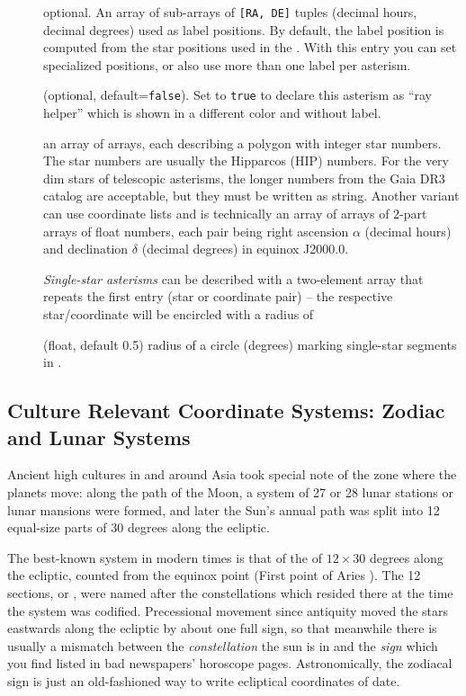 \begin{description}
\item[] optional. An array of sub-arrays of \texttt{[RA, DE]} tuples (decimal hours, decimal degrees) used as label positions. 
                               By default, the label position is computed from the star positions used in the . 
                               With this entry you can set specialized positions, or also use more than one label per asterism. 
\item[] (optional, default=\texttt{false}). 
                Set to \texttt{true} to declare this asterism as ``ray helper'' which is shown in a different color and without label. 
\item[] an array of arrays, each describing a polygon with integer star numbers. The star numbers are usually the Hipparcos (HIP) numbers. 
                    For the very dim stars of telescopic asterisms, the longer numbers from the Gaia DR3 catalog are acceptable, but they must be written as string.
					Another variant can use coordinate lists and is technically an array of arrays of 2-part arrays of float numbers, 
					each pair being right ascension $\alpha$ (decimal hours) and declination $\delta$ (decimal degrees) in equinox J2000.0. 

					\emph{Single-star asterisms}  can be described with a two-element array that repeats the first entry (star or coordinate pair)
					-- the respective star/coordinate will be encircled with a radius of
\item[] (float, default 0.5)  radius of a circle (degrees) marking single-star segments in .
\end{description}


\subsection{Culture Relevant Coordinate Systems: Zodiac and Lunar Systems}
\label{sec:skycultures:skyPartitions}
\label{SC:zodiac_lunarSystem}

Ancient high cultures in and around Asia took special note of the zone where the planets move: 
along the path of the Moon, a system of 27 or 28 lunar stations or lunar mansions were formed, 
and later the Sun's annual path was split into 12 equal-size parts of 30 degrees along the ecliptic.

The best-known system in modern times is that of the  of $12\times30$ degrees along the ecliptic, 
counted from the equinox point (First point of Aries \Aries). The 12 sections, or , 
were named after the constellations which resided there at the time the system was codified. 
Precessional movement since antiquity moved the stars eastwards along the ecliptic by about one full sign, so that meanwhile there is usually 
a mismatch between the \emph{constellation} the sun is in and the \emph{sign} which you find listed in bad newspapers' horoscope pages. 
Astronomically, the zodiacal sign is just an old-fashioned way to write ecliptical coordinates of date.  

